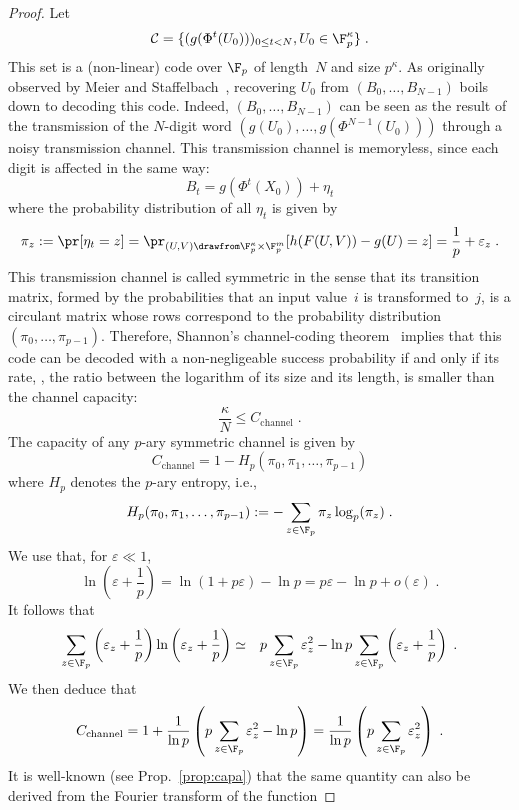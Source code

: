 \begin{proof}
  Let
  \[\mathcal{C} = \{(g(\Phi^t(U_0)))_{0 \leq t < N}, U_0 \in \F_p^\kappa\}\;.\]
  This set is a (non-linear) code over \(\F_p\) of length~\(N\) and size \(p^\kappa\).
  As originally observed by Meier and Staffelbach~\cite{EC:MeiSta88}, recovering \(U_0\) from \((B_0, \ldots, B_{N-1})\) boils down to decoding this code. Indeed, \((B_0, \ldots, B_{N-1})\) can be seen as the result of the transmission of the \(N\)-digit word \((g(U_0), \ldots, g(\Phi^{N-1}(U_0)))\)  through a noisy transmission channel. This transmission channel is memoryless, since each digit is affected in the same way:
  \[B_t = g(\Phi^{t}(X_0)) + \eta_t\]
  where the probability distribution of all \(\eta_t\) is given by
  \[\pi_z := \pr[\eta_t = z] = \pr_{(U,V) \drawfrom \F_p^\kappa \times \F_p^m}[h(F(U,V)) - g(U)=z]= \frac{1}{p} + \varepsilon_z\;.\]
  This transmission channel is called symmetric in the sense that its transition matrix, formed by the probabilities that an input value~\(i\) is transformed to~\(j\), is a circulant matrix whose rows correspond to the probability distribution \((\pi_0, \ldots, \pi_{p-1})\).
  Therefore, Shannon's channel-coding theorem~\cite[Section~7.7]{add:CovTho06} implies that this code can be decoded with a non-negligeable success probability if and only if its rate, \ie, the ratio between the logarithm of its size and its length, is smaller than the channel capacity:
  \[\frac{\kappa}{N} \leq C_{\mathrm{channel}}\;.\]
  The capacity of any \(p\)-ary symmetric channel is given by~\cite[Th.~7.2.1]{add:CovTho06}
  \[C_{\mathrm{channel}} = 1 - H_p(\pi_0, \pi_1, \ldots, \pi_{p-1})\]
  where \(H_p\) denotes the \(p\)-ary entropy, i.e.,
  \[H_p(\pi_0, \pi_1, \ldots, \pi_{p-1}) := - \sum_{z \in \F_p} \pi_z \log_p(\pi_z)\;.\]
  We use that, for \(\varepsilon \ll 1\),
  \[\ln\left(\varepsilon + \frac{1}{p}\right) = \ln(1 + p \varepsilon) - \ln p = p \varepsilon - \ln p + o(\varepsilon)\;.\]
  It follows that
  \begin{eqnarray*}
    \sum_{z \in \F_p} \left(\varepsilon_z + \frac{1}{p}\right) \ln\left(\varepsilon_z + \frac{1}{p}\right) & \simeq & p \sum_{z \in \F_p} \varepsilon_z^2 - \ln p \sum_{z \in \F_p} \left(\varepsilon_z + \frac{1}{p}\right)\;.
  \end{eqnarray*}
  We then deduce that
  \[C_{\mathrm{channel}} = 1 + \frac{1}{\ln p} \left(p \sum_{z \in \F_p} \varepsilon_z^2  -\ln p\right) = \frac{1}{\ln p} \left(p \sum_{z \in \F_p} \varepsilon_z^2\right)\;.\]
  It is well-known (see Prop.~\ref{prop:capa}) that the same quantity can also be derived from the Fourier transform of the function

\end{proof}
